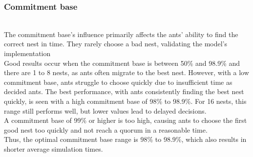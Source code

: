 \documentclass[9pt]{pnas-new}
\begin{document}
\subsubsection*{Commitment base}
\\The commitment base's influence primarily affects the ants' ability to find the correct nest in time. They rarely choose a bad nest, validating the model's implementation
\\Good results occur when the commitment base is between 50\% and 98.9\% and there are 1 to 8 nests, as ants often migrate to the best nest. However, with a low commitment base, ants struggle to choose quickly due to insufficient time as decided ants. The best performance, with ants consistently finding the best nest quickly, is seen with a high commitment base of 98\% to 98.9\%. For 16 nests, this range still performs well, but lower values lead to delayed decisions.
\\A commitment base of 99\% or higher is too high, causing ants to choose the first good nest too quickly and not reach a quorum in a reasonable time.
\\Thus, the optimal commitment base range is 98\% to 98.9\%, which also results in shorter average simulation times.
\end{document}
